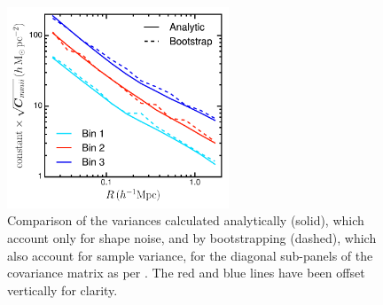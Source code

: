 \begin{figure}
\begin{minipage}[b]{2.6in}
 \centerline{\includegraphics[width=2.6in]{chapter5/compare_diagonals.pdf}}
\end{minipage}
\begin{minipage}[b]{2.2in}
\caption{Comparison of the variances calculated analytically (solid), which account only for shape 
noise, and by bootstrapping (dashed), which also account for sample variance, for the diagonal 
sub-panels of the covariance matrix as per . The red and blue lines have been 
offset vertically for clarity.}
\label{f:compare_variances}
\end{minipage}
\end{figure}






% 
